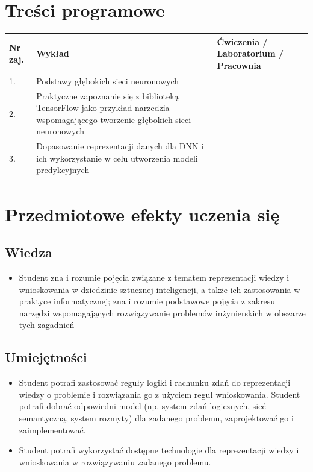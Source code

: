 \documentclass[12pt, a4paper]{article}
\begin{document}
\section{Treści programowe}

\begin{longtable}{|p{1.5cm}|p{6.5cm}|p{6.5cm}|}
\hline
\textbf{Nr zaj.} & \textbf{Wykład} & \textbf{Ćwiczenia / Laboratorium / Pracownia} \\\hline
\endhead
  \hline
  1. & Podstawy głębokich sieci neuronowych &  \\
  \hline
  2. & Praktyczne zapoznanie się z biblioteką TensorFlow jako przykład narzedzia wspomagającego tworzenie głębokich sieci neuronowych &  \\
  \hline
  3. & Dopasowanie reprezentacji danych dla DNN i ich wykorzystanie w celu utworzenia modeli predykcyjnych &  \\
  \hline
\end{longtable}

\section{Przedmiotowe efekty uczenia się}

\subsection*{Wiedza}
\begin{itemize}
  \item Student zna i rozumie pojęcia związane z tematem reprezentacji wiedzy i wnioskowania w dziedzinie sztucznej inteligencji, a także ich  zastosowania w praktyce informatycznej; zna i rozumie podstawowe pojęcia z zakresu narzędzi wspomagających rozwiązywanie problemów inżynierskich w obszarze tych zagadnień
\end{itemize}

\subsection*{Umiejętności}
\begin{itemize}
  \item Student potrafi zastosować reguły logiki i rachunku zdań do reprezentacji wiedzy o problemie i rozwiązania go z użyciem reguł wnioskowania.  Student potrafi dobrać odpowiedni model (np. system zdań logicznych, sieć semantyczną, system rozmyty) dla zadanego problemu, zaprojektować go i zaimplementować.
  \item Student potrafi wykorzystać dostępne technologie dla reprezentacji wiedzy i wnioskowania w rozwiązywaniu zadanego problemu.
\end{itemize}
\end{document}
